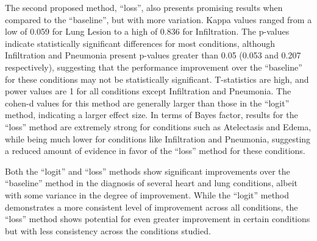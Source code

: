 The second proposed method, ``loss'', also presents promising results when compared to the ``baseline'', but with more variation. Kappa values ranged from a low of 0.059 for Lung Lesion to a high of 0.836 for Infiltration. The p-values indicate statistically significant differences for most conditions, although Infiltration and Pneumonia present p-values greater than 0.05 (0.053 and 0.207 respectively), suggesting that the performance improvement over the ``baseline'' for these conditions may not be statistically significant. T-statistics are high, and power values are 1 for all conditions except Infiltration and Pneumonia. The cohen-d values for this method are generally larger than those in the ``logit'' method, indicating a larger effect size. In terms of Bayes factor, results for the ``loss'' method are extremely strong for conditions such as Atelectasis and Edema, while being much lower for conditions like Infiltration and Pneumonia, suggesting a reduced amount of evidence in favor of the ``loss'' method for these conditions.

Both the ``logit'' and ``loss'' methods show significant improvements over the ``baseline'' method in the diagnosis of several heart and lung conditions, albeit with some variance in the degree of improvement. While the ``logit'' method demonstrates a more consistent level of improvement across all conditions, the ``loss'' method shows potential for even greater improvement in certain conditions but with less consistency across the conditions studied.

